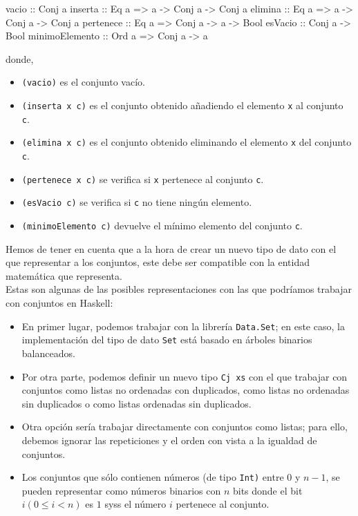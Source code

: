 \begin{code}
vacio          :: Conj a                         
inserta        :: Eq a => a -> Conj a -> Conj a
elimina        :: Eq a => a -> Conj a -> Conj a
pertenece      :: Eq a => Conj a -> a -> Bool  
esVacio        :: Conj a -> Bool
minimoElemento :: Ord a => Conj a -> a
\end{code}

donde,

\begin{itemize}
\item \texttt{(vacio)} es el conjunto vacío.
\item \texttt{(inserta x c)} es el conjunto obtenido añadiendo el      
      elemento \texttt{x} al conjunto \texttt{c}.
\item \texttt{(elimina x c)} es el conjunto obtenido eliminando el
      elemento \texttt{x} del conjunto \texttt{c}.
\item \texttt{(pertenece x c)} se verifica si \texttt{x} pertenece al
      conjunto \texttt{c}.
\item \texttt{(esVacio c)} se verifica si \texttt{c} no tiene ningún
      elemento.
\item \texttt{(minimoElemento c)} devuelve el mínimo elemento del      
      conjunto \texttt{c}.\\
\end{itemize}


Hemos de tener en cuenta que a la hora de crear un nuevo tipo de dato 
con el que representar a los conjuntos, este debe ser compatible con 
la entidad matemática que representa.\\

Estas son algunas de las posibles representaciones con las que podríamos
trabajar con conjuntos en Haskell:

\begin{itemize}
\item En primer lugar, podemos trabajar con la librería \texttt{Data.Set}; en
  este caso, la implementación del tipo de dato \texttt{Set} está basado en
  árboles binarios balanceados.
\item Por otra parte, podemos definir un nuevo tipo \texttt{Cj xs} con el que
  trabajar con conjuntos como listas no ordenadas con duplicados, como listas
  no ordenadas sin duplicados o como listas ordenadas sin duplicados.
\item Otra opción sería trabajar directamente con conjuntos como listas; para
  ello, debemos ignorar las repeticiones y el orden con vista a la igualdad de
  conjuntos. 
\item Los conjuntos que sólo contienen números (de tipo \texttt{Int)} entre
  $0$ y $n-1$, se pueden representar como números binarios con $n$ bits donde
  el bit $i (0 ≤ i < n)$ es $1$ syss el número $i$ pertenece al conjunto.
\end{itemize}


